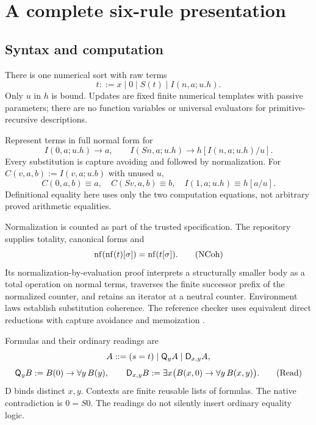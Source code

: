 \section{A complete six-rule presentation}\label{sec:system}
\subsection{Syntax and computation}
There is one numerical sort with raw terms
\[
 t::=x\mid0\mid S(t)\mid I(n,a;u.h).
\]
Only $u$ in $h$ is bound. Updates are fixed finite numerical templates
with passive parameters; there are no function variables or universal
evaluators for primitive-recursive descriptions.

Represent terms in full normal form for
\[
 I(0,a;u.h)\longrightarrow a,\qquad
 I(Sn,a;u.h)\longrightarrow h[I(n,a;u.h)/u].
 \tag{Comp}\label{eq:comp}
\]
Every substitution is capture avoiding and followed by normalization.
For $C(v,a,b):=I(v,a;u.b)$ with unused $u$,
\[
 C(0,a,b)\equiv a,\quad C(Sv,a,b)\equiv b,\quad
 I(1,a;u.h)\equiv h[a/u].
\]
Definitional equality here uses only the two computation equations,
not arbitrary proved arithmetic equalities.

Normalization is counted as part of the trusted specification.
The repository supplies totality, canonical forms and
\[
 \operatorname{nf}(\operatorname{nf}(t)[\sigma])=\operatorname{nf}(t[\sigma]).                    \tag{NCoh}
\]
Its normalization-by-evaluation proof interprets a structurally smaller
body as a total operation on normal terms, traverses the finite
successor prefix of the normalized counter, and retains an iterator at
a neutral counter. Environment laws establish substitution coherence.
The reference checker uses equivalent direct reductions with capture
avoidance and memoization \cite{normalization,current}.

Formulas and their ordinary readings are
\[
 A::=(s=t)\mid\mathsf Q_yA\mid\mathsf D_{x,y}A,
\]
\[
 \mathsf Q_yB:=B(0)\to\forall y\,B(y),\qquad
 \mathsf D_{x,y}B:=\exists x\bigl(B(x,0)\to\forall y\,B(x,y)\bigr).
 \tag{Read}\label{eq:read}
\]
D binds distinct $x,y$. Contexts are finite reusable lists of formulas.
The native contradiction is $0=S0$. The readings do not silently insert
ordinary equality logic.

